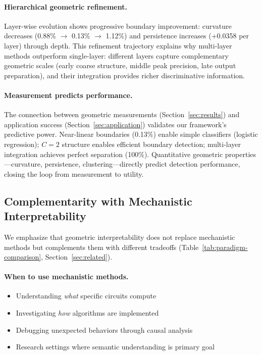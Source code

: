 \documentclass[11pt]{article}
\begin{document}
\paragraph{Hierarchical geometric refinement.} Layer-wise evolution shows progressive boundary improvement: curvature decreases (0.88\% $\to$ 0.13\% $\to$ 1.12\%) and persistence increases (+0.0358 per layer) through depth. This refinement trajectory explains why multi-layer methods outperform single-layer: different layers capture complementary geometric scales (early coarse structure, middle peak precision, late output preparation), and their integration provides richer discriminative information.

\paragraph{Measurement predicts performance.} The connection between geometric measurements (Section~\ref{sec:results}) and application success (Section~\ref{sec:application}) validates our framework's predictive power. Near-linear boundaries (0.13\%) enable simple classifiers (logistic regression); $C=2$ structure enables efficient boundary detection; multi-layer integration achieves perfect separation (100\%). Quantitative geometric properties---curvature, persistence, clustering---directly predict detection performance, closing the loop from measurement to utility.


\subsection{Complementarity with Mechanistic Interpretability}

We emphasize that geometric interpretability does not replace mechanistic methods but complements them with different tradeoffs (Table~\ref{tab:paradigm-comparison}, Section~\ref{sec:related}).

\paragraph{When to use mechanistic methods.}
\begin{itemize}
\item Understanding \textit{what} specific circuits compute
\item Investigating \textit{how} algorithms are implemented
\item Debugging unexpected behaviors through causal analysis
\item Research settings where semantic understanding is primary goal
\end{itemize}
\end{document}
